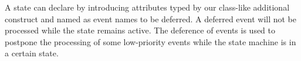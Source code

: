 \noindent
{}
A state can declare  by introducing attributes typed by our class-like additional construct  and named as event names to be deferred.
A deferred event will not be processed while the state remains active.
The deference of events is used to postpone the processing of some low-priority events while the state machine is in a certain state.



 



